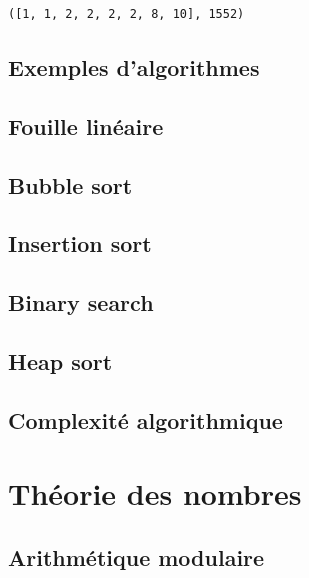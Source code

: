 \documentclass[
  letterpaper,
]{scrbook}
\theoremstyle{plain}
\theoremstyle{definition}
\theoremstyle{definition}
\theoremstyle{remark}
\begin{document}
\begin{verbatim}
([1, 1, 2, 2, 2, 2, 8, 10], 1552)
\end{verbatim}

\hypertarget{exemples-dalgorithmes}{%
\section{Exemples d'algorithmes}\label{exemples-dalgorithmes}}

\hypertarget{fouille-linuxe9aire}{%
\section{Fouille linéaire}\label{fouille-linuxe9aire}}

\hypertarget{bubble-sort}{%
\section{Bubble sort}\label{bubble-sort}}

\hypertarget{insertion-sort}{%
\section{Insertion sort}\label{insertion-sort}}

\hypertarget{binary-search}{%
\section{Binary search}\label{binary-search}}

\hypertarget{heap-sort}{%
\section{Heap sort}\label{heap-sort}}

\hypertarget{complexituxe9-algorithmique}{%
\section{Complexité algorithmique}\label{complexituxe9-algorithmique}}


\hypertarget{thuxe9orie-des-nombres}{%
\chapter{Théorie des nombres}\label{thuxe9orie-des-nombres}}

\hypertarget{arithmuxe9tique-modulaire}{%
\section{Arithmétique modulaire}\label{arithmuxe9tique-modulaire}}
\end{document}
